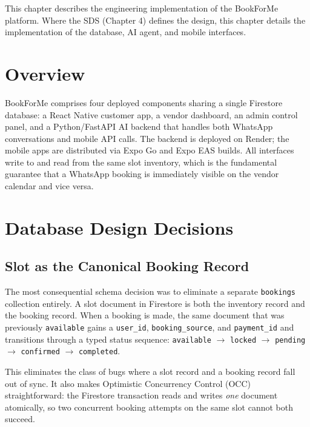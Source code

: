 
This chapter describes the engineering implementation of the BookForMe platform. Where the SDS (Chapter 4) defines the design, this chapter details the implementation of the database, AI agent, and mobile interfaces.

\section{Overview}
\label{sec:dev-overview}

BookForMe comprises four deployed components sharing a single Firestore database: a React Native customer app, a vendor dashboard, an admin control panel, and a Python/FastAPI AI backend that handles both WhatsApp conversations and mobile API calls. The backend is deployed on Render; the mobile apps are distributed via Expo Go and Expo EAS builds. All interfaces write to and read from the same slot inventory, which is the fundamental guarantee that a WhatsApp booking is immediately visible on the vendor calendar and vice versa.

\section{Database Design Decisions}
\label{sec:dev-database}

\subsection{Slot as the Canonical Booking Record}

The most consequential schema decision was to eliminate a separate \texttt{bookings} collection entirely. A slot document in Firestore is both the inventory record and the booking record. When a booking is made, the same document that was previously \texttt{available} gains a \texttt{user\_id}, \texttt{booking\_source}, and \texttt{payment\_id} and transitions through a typed status sequence: \texttt{available} $\to$ \texttt{locked} $\to$ \texttt{pending} $\to$ \texttt{confirmed} $\to$ \texttt{completed}.

This eliminates the class of bugs where a slot record and a booking record fall out of sync. It also makes Optimistic Concurrency Control (OCC) straightforward: the Firestore transaction reads and writes \emph{one} document atomically, so two concurrent booking attempts on the same slot cannot both succeed.

